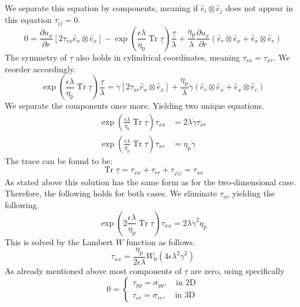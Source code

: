 \documentclass[a4paper,12pt]{scrartcl}
\newcommand{\ma}[1]{\underline{#1}}
\DeclareMathOperator{\Tr}{Tr}
\begin{document}
We separate this equation by components, meaning if $\hat{e}_i\otimes\hat{e}_j$ does not appear in this equation $\tau_{ij} = 0$.
\begin{equation}
	0 = \frac{\partial u_x}{\partial r}\left[2\tau_{rx}\hat{e}_x\otimes\hat{e}_x\right]- \exp\left(\frac{\epsilon\lambda}{\eta_\text{p}}\Tr\ma{\tau}\right)\frac{\ma{\tau}}{\lambda} + \frac{\eta_\text{p}}{\lambda}\frac{\partial u_x}{\partial r}\left(\hat{e}_r\otimes\hat{e}_x + \hat{e}_x\otimes\hat{e}_r\right)
\end{equation}
The symmetry of $\ma{\tau}$ also holds in cylindrical coordinates, meaning $\tau_{rx} = \tau_{xr}$. We reorder accordingly.
\begin{equation}
	\exp\left(\frac{\epsilon\lambda}{\eta_\text{p}}\Tr\ma{\tau}\right)\frac{\ma{\tau}}{\lambda} = \dot{\gamma}\left[2\tau_{xr}\hat{e}_x\otimes\hat{e}_x\right] + \frac{\eta_\text{p}}{\lambda}\dot{\gamma}\left(\hat{e}_r\otimes\hat{e}_x + \hat{e}_x\otimes\hat{e}_r\right)
\end{equation}
We separate the components once more. Yielding two unique equations.
\begin{align}
	\exp\left(\frac{\epsilon\lambda}{\eta_\text{p}}\Tr\ma{\tau}\right)\tau_{xx} &= 2\lambda\dot{\gamma}\tau_{xr} \\
	\exp\left(\frac{\epsilon\lambda}{\eta_\text{p}}\Tr\ma{\tau}\right)\tau_{xr} &= \eta_\text{p}\dot{\gamma}
\end{align}
The trace can be found to be:
\begin{equation}
	\Tr\ma{\tau} = \tau_{xx} + \tau_{rr} + \tau_{\varphi\varphi} = \tau_{xx}
\end{equation}
As stated above this solution has the same form as for the two-dimensional case. Therefore, the following holds for both cases.
We eliminate $\tau_{xr}$ yielding the following.
\begin{equation}
	\exp\left(2\frac{\epsilon\lambda}{\eta_\text{p}}\Tr\ma{\tau}\right)\tau_{xx} = 2\lambda\dot{\gamma}^2\eta_\text{p}
\end{equation}
This is solved by the Lambert $W$ function as follows.
\begin{equation}
	\tau_{xx} = \frac{\eta_\text{p}}{2\epsilon\lambda}W_0\left(4\epsilon\lambda^2\dot{\gamma}^2\right)\label{eq:tau_xx}
\end{equation}
As already mentioned above most components of $\ma{\tau}$ are zero, using specifically
\begin{equation}
	0 = \begin{cases}
		\tau_{yy} = \sigma_{yy},\quad\text{in 2D} \\
		\tau_{rr} = \sigma_{rr},\quad\text{in 3D}
	\end{cases}
\end{equation}
\end{document}
